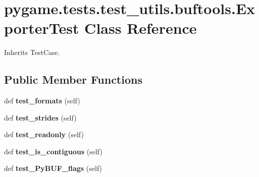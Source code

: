 \hypertarget{classpygame_1_1tests_1_1test__utils_1_1buftools_1_1_exporter_test}{}\section{pygame.\+tests.\+test\+\_\+utils.\+buftools.\+Exporter\+Test Class Reference}
\label{classpygame_1_1tests_1_1test__utils_1_1buftools_1_1_exporter_test}


Inherits Test\+Case.

\subsection*{Public Member Functions}
\begin{DoxyCompactItemize}
\item 
\mbox{\label{classpygame_1_1tests_1_1test__utils_1_1buftools_1_1_exporter_test_a707d0fa19fac503b91beb55bf7cdb367}} 
def {\bfseries test\+\_\+formats} (self)
\item 
\mbox{\label{classpygame_1_1tests_1_1test__utils_1_1buftools_1_1_exporter_test_aac6ad20d958b8ae3a8f8f3bfa4e19c5e}} 
def {\bfseries test\+\_\+strides} (self)
\item 
\mbox{\label{classpygame_1_1tests_1_1test__utils_1_1buftools_1_1_exporter_test_a8dab47107b50f63be5ec4489a7e0a33f}} 
def {\bfseries test\+\_\+readonly} (self)
\item 
\mbox{\label{classpygame_1_1tests_1_1test__utils_1_1buftools_1_1_exporter_test_a5dbea4f13afe0cf5336c289575747011}} 
def {\bfseries test\+\_\+is\+\_\+contiguous} (self)
\item 
\mbox{\label{classpygame_1_1tests_1_1test__utils_1_1buftools_1_1_exporter_test_ae941ac5190f903290f2639b265576643}} 
def {\bfseries test\+\_\+\+Py\+B\+U\+F\+\_\+flags} (self)
\item 
\mbox{\label{classpygame_1_1tests_1_1test__utils_1_1buftools_1_1_exporter_test_acb76518e80b7679b49e17d88bd0a6fb1}} 

\end{DoxyCompactItemize}
